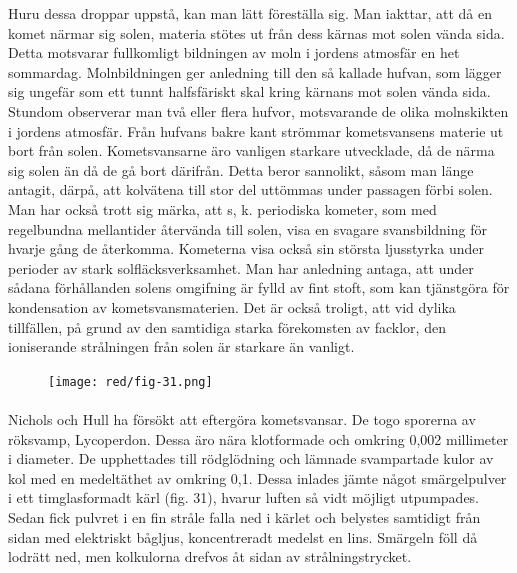 \documentclass[a4paper, 12pt, oneside, swedish]{article}
\begin{document}
Huru dessa droppar uppstå, kan man lätt föreställa sig. Man iakttar, att då en komet närmar sig solen, materia stötes ut från dess kärnas mot solen vända sida. Detta motsvarar fullkomligt bildningen av moln i jordens atmosfär en het sommardag. Molnbildningen ger anledning till den så kallade hufvan, som lägger sig ungefär som ett tunnt halfsfäriskt skal kring kärnans mot solen vända sida. Stundom observerar man två eller flera hufvor, motsvarande de olika molnskikten i jordens atmosfär. Från hufvans bakre kant strömmar kometsvansens materie ut bort från solen. Kometsvansarne äro vanligen starkare utvecklade, då de närma sig solen än då de gå bort därifrån. Detta beror sannolikt, såsom man länge antagit, därpå, att kolvätena till stor del uttömmas under passagen förbi solen. Man har också trott sig märka, att s, k. periodiska kometer, som med regelbundna mellantider återvända till solen, visa en svagare svansbildning för hvarje gång de återkomma. Kometerna visa också sin största ljusstyrka under perioder av stark solfläcksverksamhet. Man har anledning antaga, att under sådana förhållanden solens omgifning är fylld av fint stoft, som kan tjänstgöra för kondensation av kometsvansmaterien. Det är också troligt, att vid dylika tillfällen, på grund av den samtidiga starka förekomsten av facklor, den ioniserande strålningen från solen är starkare än vanligt.

\begin{figure}[H]
\centering
\texttt{[image: red/fig-31.png]}
\caption{}
\end{figure}
\paragraph{}
Nichols och Hull ha försökt att eftergöra kometsvansar. De togo sporerna av röksvamp, Lycoperdon. Dessa äro nära klotformade och omkring 0,002 millimeter i diameter. De upphettades till rödglödning och lämnade svampartade kulor av kol med en medeltäthet av omkring 0,1. Dessa inlades jämte något smärgelpulver i ett timglasformadt kärl (fig. 31), hvarur luften så vidt möjligt utpumpades. Sedan fick pulvret i en fin stråle falla ned i kärlet och belystes samtidigt från sidan med elektriskt bågljus, koncentreradt medelst en lins. Smärgeln föll då lodrätt ned, men kolkulorna drefvos åt sidan av strålningstrycket.
\end{document}
